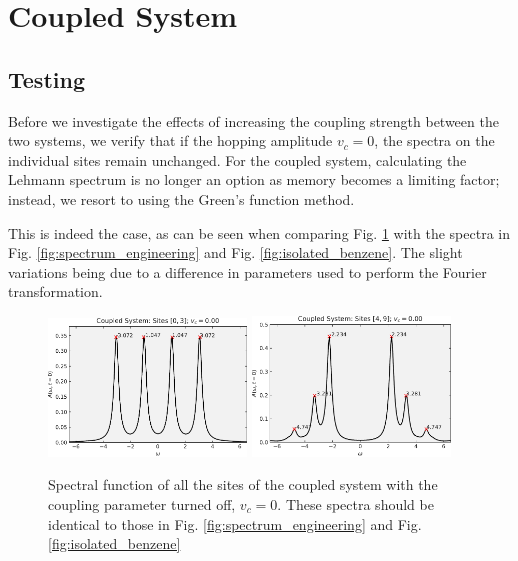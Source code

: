 \section{Coupled System}

\subsection{Testing}
Before we investigate the effects of increasing the coupling strength between the two systems, we verify that if the hopping amplitude $v_c = 0$, the spectra on the individual sites remain unchanged. For the coupled system, calculating the Lehmann spectrum is no longer an option as memory becomes a limiting factor; instead, we resort to using the Green's function method.

\medskip
This is indeed the case, as can be seen when comparing Fig. \ref{fig:coupled_vc_0} with the spectra in Fig. \ref{fig:spectrum_engineering} and Fig. \ref{fig:isolated_benzene}. The slight variations being due to a difference in parameters used to perform the Fourier transformation.

\begin{figure}[!hbt]
    \centering
    \includegraphics[width=0.47\textwidth]{graph/coupled_QD_vc_0.pdf}
    \includegraphics[width=0.47\textwidth]{graph/coupled_benzene_vc_0.pdf}
    \caption{Spectral function of all the sites of the coupled system with the coupling parameter turned off, $v_c = 0$. These spectra should be identical to those in Fig. \ref{fig:spectrum_engineering} and Fig. \ref{fig:isolated_benzene}}
    \label{fig:coupled_vc_0}
\end{figure}

